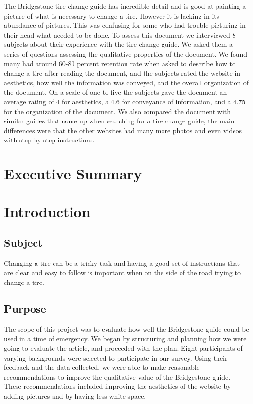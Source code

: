 \documentclass[12pt,A4paper]{article}
\begin{document}
	The Bridgestone tire change guide has incredible detail and is good at painting a picture of what is necessary to change a tire. However it is lacking in its abundance of pictures. This was confusing for some who had trouble picturing in their head what needed to be done. To assess this document we interviewed 8 subjects about their experience with the tire change guide. We asked them a series of questions assessing the qualitative properties of the document. We found many had around 60-80 percent retention rate when asked to describe how to change a tire after reading the document, and the subjects rated the website in aesthetics, how well the information was conveyed, and the overall organization of the document. On a scale of one to five the subjects gave the document an average rating of 4 for aesthetics, a 4.6 for conveyance of information, and a 4.75 for the organization of the document. We also compared the document with similar guides that come up when searching for a tire change guide; the main differences were that the other websites had many more photos and even videos with step by step instructions.
	
	\clearpage
	
	\setcounter{page}{2}
	
	\tableofcontents

	
	\renewcommand\listfigurename{List of Illustrations}
	\listoffigures

	\clearpage
	\section{Executive Summary}

	\section{Introduction}
	
		\subsection{Subject}
		Changing a tire can be a tricky task and having a good set of instructions that are clear and easy to follow is important when on the side of the road trying to change a tire.

		\subsection{Purpose}
		The scope of this project was to evaluate how well the Bridgestone guide could be used in a time of emergency. We began by structuring and planning how we were going to evaluate the article, and proceeded with the plan. Eight participants of varying backgrounds were selected to participate in our survey. Using their feedback and the data collected, we were able to make reasonable recommendations to improve the qualitative value of the Bridgestone guide. These recommendations included improving the aesthetics of the website by adding pictures and by having less white space. 
\end{document}

